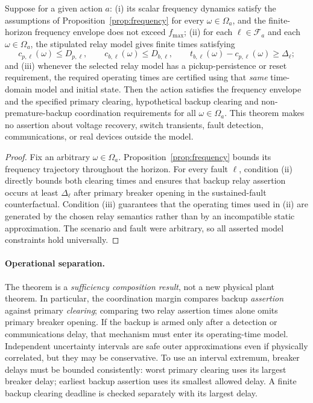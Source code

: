 \begin{theorem}\label{thm:joint-suff}
Suppose for a given action \(a\): (i) its scalar frequency dynamics satisfy the assumptions of Proposition~\ref{prop:frequency} for every \(\omega\in\Omega_a\), and the finite-horizon frequency envelope does not exceed \(f_{\max}\); (ii) for each \(\ell\in\mathcal F_a\) and each \(\omega\in\Omega_a\), the stipulated relay model gives finite times satisfying
\[
c_{p,\ell}(\omega)\le D_{p,\ell},\qquad
c_{b,\ell}(\omega)\le D_{b,\ell},\qquad
t_{b,\ell}(\omega)-c_{p,\ell}(\omega)\ge\Delta_\ell;
\]
and (iii) whenever the selected relay model has a pickup-persistence or reset requirement, the required operating times are certified using that \emph{same} time-domain model and initial state. Then the action satisfies the frequency envelope and the specified primary clearing, hypothetical backup clearing and non-premature-backup coordination requirements for all \(\omega\in\Omega_a\). This theorem makes no assertion about voltage recovery, switch transients, fault detection, communications, or real devices outside the model.
\end{theorem}
\begin{proof}
Fix an arbitrary \(\omega\in\Omega_a\). Proposition~\ref{prop:frequency} bounds its frequency trajectory throughout the horizon. For every fault \(\ell\), condition (ii) directly bounds both clearing times and ensures that backup relay assertion occurs at least \(\Delta_\ell\) after primary breaker opening in the sustained-fault counterfactual. Condition (iii) guarantees that the operating times used in (ii) are generated by the chosen relay semantics rather than by an incompatible static approximation. The scenario and fault were arbitrary, so all asserted model constraints hold universally.
\end{proof}
\paragraph{Operational separation.}
The theorem is a \emph{sufficiency composition result}, not a new physical plant theorem. In particular, the coordination margin compares backup \emph{assertion} against primary \emph{clearing}; comparing two relay assertion times alone omits primary breaker opening. If the backup is armed only after a detection or communications delay, that mechanism must enter its operating-time model. Independent uncertainty intervals are safe outer approximations even if physically correlated, but they may be conservative. To use an interval extremum, breaker delays must be bounded consistently: worst primary clearing uses its largest breaker delay; earliest backup assertion uses its smallest allowed delay. A finite backup clearing deadline is checked separately with its largest delay.


